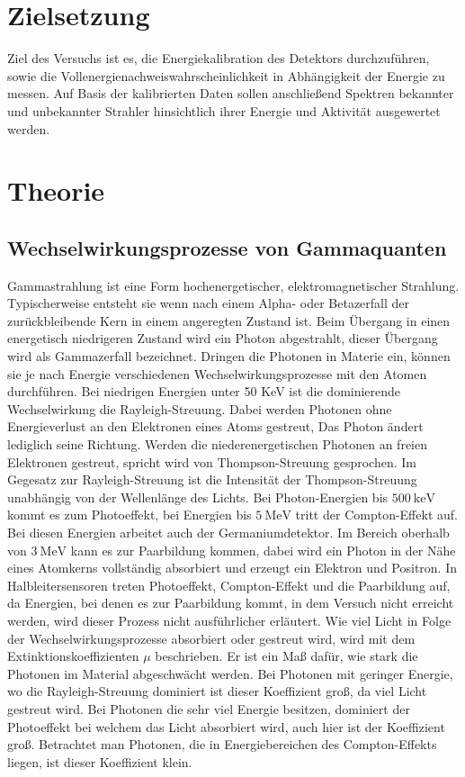 
\section{Zielsetzung}
\label{sec:Zielsetzung}
Ziel des Versuchs ist es, die Energiekalibration des Detektors durchzuführen, sowie 
die Vollenergienachweiswahrscheinlichkeit in Abhängigkeit der Energie zu messen. Auf Basis der kalibrierten Daten sollen 
anschließend Spektren bekannter und unbekannter Strahler hinsichtlich ihrer Energie und Aktivität ausgewertet werden.

\section{Theorie}
\label{sec:Theorie}
\subsection{Wechselwirkungsprozesse von Gammaquanten}
Gammastrahlung ist eine Form hochenergetischer, elektromagnetischer Strahlung. Typischerweise entsteht sie wenn nach einem 
Alpha- oder Betazerfall der zurückbleibende Kern in einem angeregten Zustand ist. Beim Übergang in einen energetisch niedrigeren 
Zustand wird ein Photon abgestrahlt, dieser Übergang wird als Gammazerfall bezeichnet. Dringen die Photonen in Materie ein, können sie 
je nach Energie verschiedenen Wechselwirkungsprozesse mit den Atomen durchführen. Bei niedrigen Energien unter 50 KeV ist die
dominierende Wechselwirkung die Rayleigh-Streuung. Dabei werden Photonen ohne Energieverlust an den Elektronen eines Atoms gestreut,
Das Photon ändert lediglich seine Richtung. Werden die niederenergetischen Photonen an freien Elektronen gestreut, spricht wird von 
Thompson-Streuung gesprochen. Im Gegesatz zur Rayleigh-Streuung ist die Intensität der Thompson-Streuung unabhängig von der Wellenlänge des Lichts.
Bei Photon-Energien bis $\qty{500}{\kilo\electronvolt}$ kommt es zum Photoeffekt, bei Energien bis $\qty{5}{\mega\electronvolt}$ tritt der Compton-Effekt auf. Bei diesen 
Energien arbeitet auch der Germaniumdetektor. Im Bereich oberhalb von $\qty{3}{\mega\electronvolt}$ kann es zur 
Paarbildung kommen, dabei wird ein Photon in der Nähe eines Atomkerns vollständig absorbiert und erzeugt ein Elektron und Positron.
In Halbleitersensoren treten Photoeffekt, Compton-Effekt und die Paarbildung auf, da Energien, bei denen es zur Paarbildung kommt, in dem Versuch
nicht erreicht werden, wird dieser Prozess nicht ausführlicher erläutert. Wie viel Licht in Folge der Wechselwirkungsprozesse absorbiert oder 
gestreut wird, wird mit dem Extinktionskoeffizienten $\mu$ beschrieben. Er ist ein Maß dafür, wie stark die Photonen im Material abgeschwächt werden. Bei
Photonen mit geringer Energie, wo die Rayleigh-Streuung dominiert ist dieser Koeffizient groß, da viel Licht gestreut wird. Bei Photonen die sehr 
viel Energie besitzen, dominiert der Photoeffekt bei welchem das Licht absorbiert wird, auch hier ist der Koeffizient groß. Betrachtet man Photonen, die 
in Energiebereichen des Compton-Effekts liegen, ist dieser Koeffizient klein.
\cite{Gammastrahlung}


